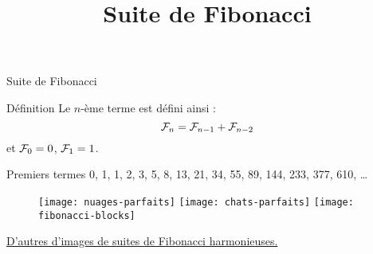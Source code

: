 \documentclass[10pt]{beamer}
\title{Suite de Fibonacci}
\newcommand{\F}[1]{\ensuremath{{\cal F}_{#1}}\xspace}
\begin{document}
\maketitle

\begin{frame}{Suite de Fibonacci}

  \begin{block}{Définition}
    Le $n$-ème terme est défini ainsi :
    \begin{equation*}
      \F{n} = \F{n-1} + \F{n-2}
    \end{equation*}
    et $\F{0} = 0$, $\F{1} = 1$.
  \end{block}

  \begin{exampleblock}{Premiers termes}
    0, 1, 1, 2, 3, 5, 8, 13, 21, 34, 55, 89, 144, 233, 377, 610, \dots
  \end{exampleblock}
  \begin{figure}[htbp]
    \centering
    \texttt{[image: nuages-parfaits]}
    \hfill
    \texttt{[image: chats-parfaits]}
    \hfill
    \texttt{[image: fibonacci-blocks]}
  \end{figure}
  \href{https://archzine.fr/lifestyle/art/suite-de-fibonacci-harmonieuse/}{D'autres d'images de suites de Fibonacci harmonieuses.}

\end{frame}
\end{document}
